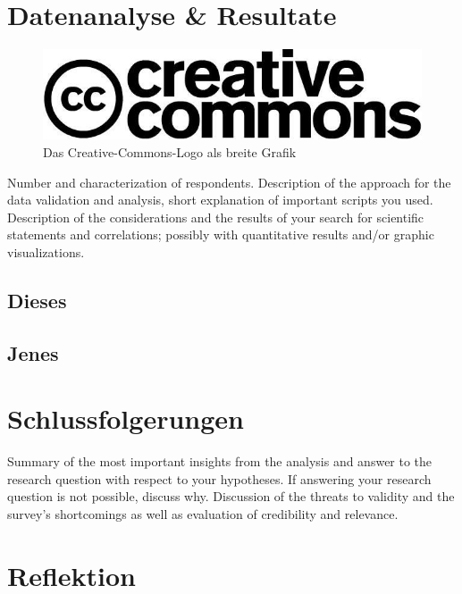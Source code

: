\documentclass[de]{agse-empir-report}\usepackage[]{graphicx}\usepackage[]{color}
\begin{document}
\lipsum[4]


\section[pb]{Datenanalyse \& Resultate}

\begin{figure}
    \includegraphics[width=\linewidth]{creative_commons.jpg}
    \caption{Das Creative-Commons-Logo als breite Grafik}
\end{figure}

Number and characterization of respondents.
Description of the approach for the data validation and
analysis, short explanation of important scripts you used.
Description of the considerations and the results of your search for
scientific statements and correlations; possibly with quantitative
results and/or graphic visualizations.

\lipsum[5]


\subsection{Dieses}
\lipsum[6]


\subsection[mds]{Jenes}
\lipsum[7-8]


\section[hs]{Schlussfolgerungen}
Summary of the most important insights from the analysis and
answer to the research question with respect to your hypotheses.
If answering your research question is not possible, discuss why.
Discussion of the threats to validity and the survey's
shortcomings as well as evaluation of credibility and relevance.

\lipsum[9-10]


\section[kk]{Reflektion}
\end{document}

